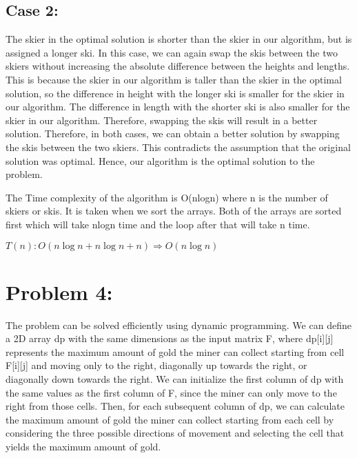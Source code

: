 \documentclass[fleqn,10pt]{olplainarticle}
\begin{document}
\subsection*{Case 2:}
The skier in the optimal solution is shorter than the skier in our algorithm, but is assigned a longer ski.
In this case, we can again swap the skis between the two skiers without increasing the absolute difference between the heights and lengths. This is because the skier in our algorithm is taller than the skier in the optimal solution, so the difference in height with the longer ski is smaller for the skier in our algorithm. The difference in length with the shorter ski is also smaller for the skier in our algorithm. Therefore, swapping the skis will result in a better solution.
Therefore, in both cases, we can obtain a better solution by swapping the skis between the two skiers. This contradicts the assumption that the original solution was optimal.
Hence, our algorithm is the optimal solution to the problem.

The Time complexity of the algorithm is O(nlogn) where n is the number of skiers or skis. It is taken when we sort the arrays. Both of the arrays are sorted first which will take nlogn time and the loop after that will take n time.\newline

$T(n) : O( n\log n + n\log n + n ) \Rightarrow O(n\log n)$

\section*{Problem 4:}

The problem can be solved efficiently using dynamic programming. We can define a 2D array dp with the same dimensions as the input matrix F, where dp[i][j] represents the maximum amount of gold the miner can collect starting from cell F[i][j] and moving only to the right, diagonally up towards the right, or diagonally down towards the right.
\newline We can initialize the first column of dp with the same values as the first column of F, since the miner can only move to the right from those cells. Then, for each subsequent column of dp, we can calculate the maximum amount of gold the miner can collect starting from each cell by considering the three possible directions of movement and selecting the cell that yields the maximum amount of gold.
\end{document}
